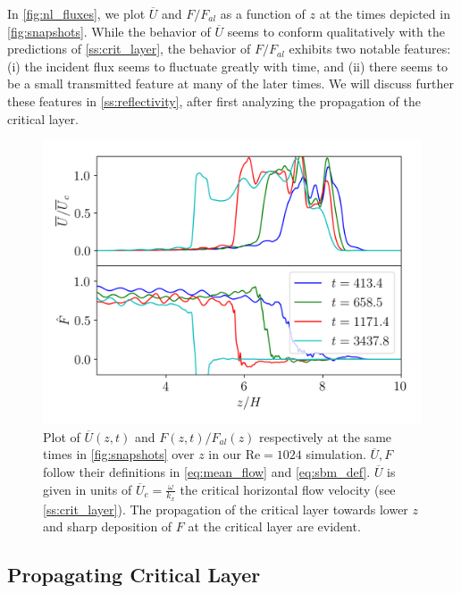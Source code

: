 \documentclass[
        fleqn,
        usenatbib,
    ]{mnras}
\begin{document}
In \autoref{fig:nl_fluxes}, we plot $\overline{U}$ and $F / F_{al}$ as a function
of $z$ at the times depicted in \autoref{fig:snapshots}. While the behavior of
$\overline{U}$ seems to conform qualitatively with the predictions of
\autoref{ss:crit_layer}, the behavior of $F / F_{al}$ exhibits two notable
features: (i) the incident flux seems to fluctuate greatly with time, and (ii)
there seems to be a small transmitted feature at many of the later times. We
will discuss further these features in \autoref{ss:reflectivity}, after first
analyzing the propagation of the critical layer.
\begin{figure}
    \centering
    \includegraphics[width=\columnwidth]{plots/nl_fluxes.png}
    \caption{Plot of $\overline{U}(z, t)$ and $F(z, t) / F_{al}(z)$ respectively
    at the same times in \autoref{fig:snapshots} over $z$ in our $\mathrm{Re} =
    1024$ simulation. $\overline{U}, F$ follow their definitions in
    \autoref{eq:mean_flow} and \autoref{eq:sbm_def}. $\overline{U}$ is given in
    units of $\overline{U}_c = \frac{\omega}{k_{x}}$ the critical horizontal
    flow velocity (see \autoref{ss:crit_layer}). The propagation of the critical
    layer towards lower $z$ and sharp deposition of $F$ at the critical layer
    are evident.}\label{fig:nl_fluxes}
\end{figure}

\subsection{Propagating Critical Layer}
\end{document}
